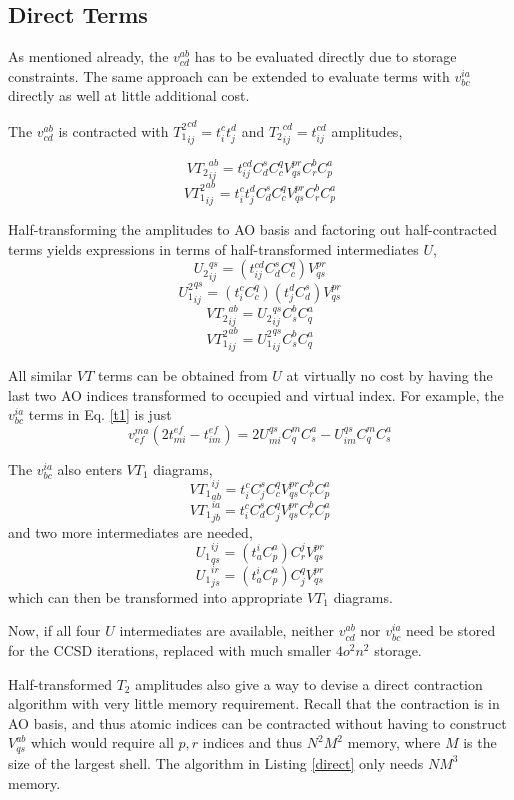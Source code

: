 \documentclass[12pt]{article} \usepackage[margin=1in]{geometry}
\begin{document}
\subsection{Direct Terms}
As mentioned already, the $v^{ab}_{cd}$ has to be evaluated directly
due to storage constraints.  The same approach can be extended to
evaluate terms with $v^{ia}_{bc}$ directly as well at little
additional cost.

The $v^{ab}_{cd}$ is contracted with 
${T_1^2}^{cd}_{ij} = t^c_i t^d_j$ and
${T_2}^{cd}_{ij} = t^{cd}_{ij}$ amplitudes,

$${VT_2}^{ab}_{ij} = t_{ij}^{cd} C^s_d C^q_c V^{pr}_{qs} C^b_r C^a_p$$
$${VT_1^2}^{ab}_{ij} = t^c_i t^d_j C^s_d C^q_c V^{pr}_{qs} C^b_r C^a_p$$

Half-transforming the amplitudes to AO basis and factoring out
half-contracted terms yields expressions in terms of half-transformed
intermediates $U$,
$${U_2}^{qs}_{ij} = (t_{ij}^{cd} C^s_d C^q_c) V^{pr}_{qs}$$
$${U_1^2}^{qs}_{ij} = (t_{i}^{c} C^q_c) (t_j^d C^s_d) V^{pr}_{qs}$$
$${VT_2}^{ab}_{ij} = {U_2}^{qs}_{ij} C^b_s C^a_q$$
$${VT_1^2}^{ab}_{ij} = {U_1^2}^{qs}_{ij} C^b_s C^a_q$$

All similar $VT$ terms can be obtained from $U$ at virtually no cost by
having the last two AO indices transformed to occupied and virtual index.
For example, the $v^{ia}_{bc}$ terms in Eq. \ref{t1} is just
$$v^{ma}_{ef}(2 t^{ef}_{mi} - t^{ef}_{im}) =
2 U_{mi}^{qs} C_q^m C_s^a - U_{im}^{qs} C_q^m C_s^a$$

The $v^{ia}_{bc}$ also enters $VT_1$ diagrams,
$${VT_1}^{ij}_{ab} = t^c_i C^s_j C^q_c V^{pr}_{qs} C^b_r C^a_p$$
$${VT_1}^{ia}_{jb} = t^c_i C^s_d C^q_j V^{pr}_{qs} C^b_r C^a_p$$
and two more intermediates are needed,
$${U_1}^{ij}_{qs} = (t^i_a C^a_p) C^j_r V^{pr}_{qs}$$
$${U_1}^{ir}_{js} = (t^i_a C^a_p) C^q_j V^{pr}_{qs}$$
which can then be transformed into appropriate $VT_1$ diagrams.

Now, if all four $U$ intermediates are available, neither
$v^{ab}_{cd}$ nor $v^{ia}_{bc}$ need be stored for the CCSD
iterations, replaced with much smaller $4o^2n^2$ storage.

Half-transformed $T_2$ amplitudes also give a way to devise a direct
contraction algorithm with very little memory requirement.  Recall
that the contraction is in AO basis, and thus atomic indices can be
contracted without having to construct $V^{ab}_{qs}$ which would
require all $p,r$ indices and thus $N^2M^2$ memory, where $M$ is the
size of the largest shell.  The algorithm in Listing \ref{direct} only
needs $NM^3$ memory.
\end{document}
